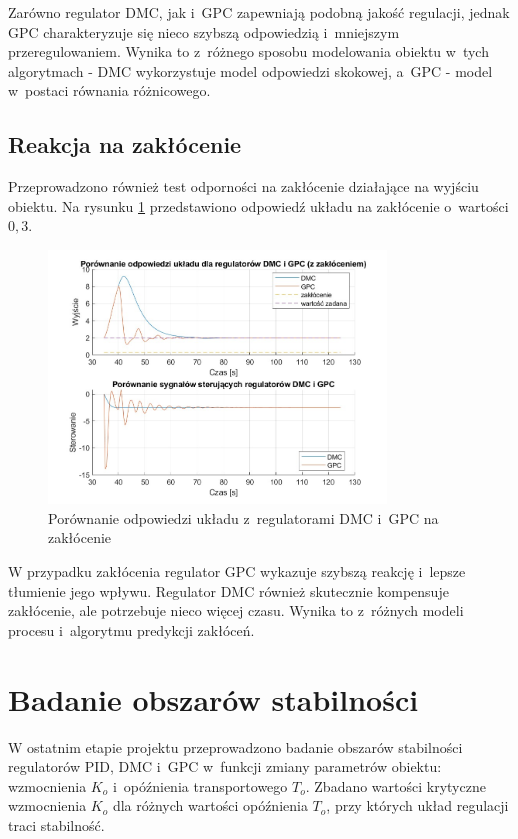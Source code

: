 \documentclass[a4paper,titlepage,11pt,floatssmall]{mwrep}
\begin{document}
Zarówno regulator DMC, jak i~GPC zapewniają podobną jakość regulacji, jednak GPC charakteryzuje się nieco szybszą odpowiedzią i~mniejszym przeregulowaniem. Wynika to z~różnego sposobu modelowania obiektu w~tych algorytmach - DMC wykorzystuje model odpowiedzi skokowej, a~GPC - model w~postaci równania różnicowego.

\subsection{Reakcja na zakłócenie}

Przeprowadzono również test odporności na zakłócenie działające na wyjściu obiektu. Na rysunku \ref{fig:dmc_gpc_disturbance} przedstawiono odpowiedź układu na zakłócenie o~wartości $0,3$.

\begin{figure}[H]
    \centering
    \includegraphics[width=0.8\textwidth]{kod/wykresy/DMC_vs_GPC_disturbance.jpg}
    \caption{Porównanie odpowiedzi układu z~regulatorami DMC i~GPC na zakłócenie}
    \label{fig:dmc_gpc_disturbance}
\end{figure}

W przypadku zakłócenia regulator GPC wykazuje szybszą reakcję i~lepsze tłumienie jego wpływu. Regulator DMC również skutecznie kompensuje zakłócenie, ale potrzebuje nieco więcej czasu. Wynika to z~różnych modeli procesu i~algorytmu predykcji zakłóceń.

\section{Badanie obszarów stabilności}

W ostatnim etapie projektu przeprowadzono badanie obszarów stabilności regulatorów PID, DMC i~GPC w~funkcji zmiany parametrów obiektu: wzmocnienia $K_o$ i~opóźnienia transportowego $T_o$. Zbadano wartości krytyczne wzmocnienia $K_o$ dla różnych wartości opóźnienia $T_o$, przy których układ regulacji traci stabilność.
\end{document}
